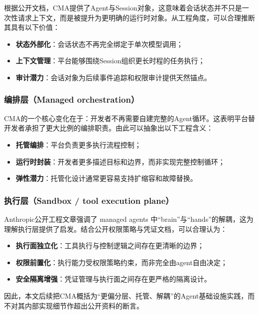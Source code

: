 \documentclass[12pt,a4paper]{ctexart}
\begin{document}
根据公开文档，CMA提供了Agent与Session对象，这意味着会话状态并不只是一次性请求上下文，而是被提升为更明确的运行时对象。从工程角度，可以合理推断其具有以下价值：

\begin{itemize}
    \item \textbf{状态外部化}：会话状态不再完全绑定于单次模型调用；
    \item \textbf{上下文管理}：平台能够围绕Session组织更长时程的任务执行；
    \item \textbf{审计潜力}：会话对象为后续事件追踪和权限审计提供天然锚点。
\end{itemize}

\subsubsection{编排层（Managed orchestration）}

CMA的一个核心变化在于：开发者不再需要自建完整的Agent循环。这表明平台替开发者承担了更大比例的编排职责。由此可以抽象出以下工程含义：

\begin{itemize}
    \item \textbf{托管编排}：平台负责更多执行流程控制；
    \item \textbf{运行时封装}：开发者更多描述目标和边界，而非实现完整控制循环；
    \item \textbf{弹性潜力}：托管化设计通常更容易支持扩缩容和故障替换。
\end{itemize}

\subsubsection{执行层（Sandbox / tool execution plane）}

Anthropic公开工程文章强调了 managed agents 中“brain”与“hands”的解耦，这为理解执行层提供了启发。结合公开权限策略与凭证文档，可以合理认为：

\begin{itemize}
    \item \textbf{执行面独立化}：工具执行与控制逻辑之间存在更清晰的边界；
    \item \textbf{权限前置化}：执行能力受权限策略约束，而非完全由agent自由决定；
    \item \textbf{安全隔离增强}：凭证管理与执行面之间存在更严格的隔离设计。
\end{itemize}

因此，本文后续把CMA概括为“更偏分层、托管、解耦”的Agent基础设施实践，而不对其内部实现细节作超出公开资料的断言。
\end{document}
